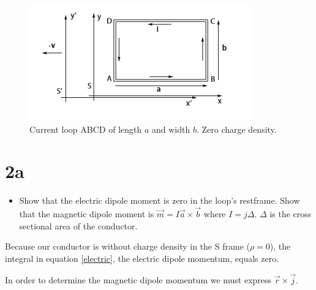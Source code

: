 \documentclass{report}
\begin{document}
\begin{figure}
\centering
\includegraphics{loop}
\caption{Current loop ABCD of length $a$ and width $b$. Zero charge density.}
\label{loop}
\end{figure}
\section*{2a}
\begin{itemize}
\item
Show that the electric dipole moment is zero in the loop\rq{}s restframe. Show that the magnetic dipole moment is $\vec m = I\vec a \times \vec b$ where $I = j\Delta$. $\Delta $ is the cross sectional area of the conductor. 
\end{itemize}
Because our conductor is without charge density in the S frame ($\rho = 0$), the integral in equation \ref{electric}, the electric dipole momentum, equals zero.

In order to determine the magnetic dipole momentum we must express $\vec r \times \vec j$.
\end{document}
